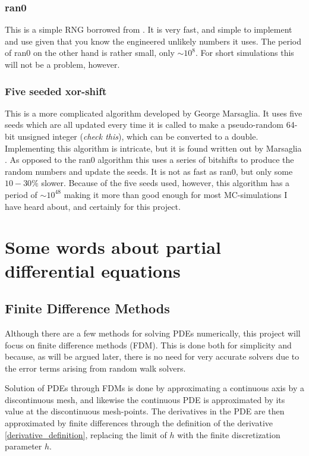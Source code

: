 \subsubsection{ran0}

This is a simple RNG borrowed from \cite{hjorth2011computational}. 
It is very fast, and simple to implement and use given that you know the engineered unlikely numbers it uses. 
The period of ran0 on the other hand is rather small, only $\sim 10^8$. For short simulations this will not be a problem, however.

\subsubsection{Five seeded xor-shift}

This is a more complicated algorithm developed by George Marsaglia. 
It uses five seeds which are all updated every time it is called to make a pseudo-random 64-bit unsigned integer (\emph{check this}), which can be converted to a double. 
Implementing this algorithm is intricate, but it is found written out by Marsaglia \cite{marsaglia2003xorshift}. 
As opposed to the ran0 algorithm this uses a series of bitshifts to produce the random numbers and update the seeds. 
It is not as fast as ran0, but only some $10-30\%$ slower. 
Because of the five seeds used, however, this algorithm has a period of $\sim10^{48}$ \cite{marsaglia2003xorshift} making it more than good enough for most MC-simulations I have heard about, and certainly for this project.

\section{Some words about partial differential equations}\label{some_words_on_PDEs}

\subsection{Finite Difference Methods}\label{finite_difference_methods}

Although there are a few methods for solving PDEs numerically, this project will focus on finite difference methods (FDM). 
This is done both for simplicity and because, as will be argued later, there is no need for very accurate solvers due to the error terms arising from random walk solvers. 

Solution of PDEs through FDMs is done by approximating a continuous axis by a discontinuous mesh, and likewise the continuous PDE is approximated by its value at the discontinuous mesh-points. 
The derivatives in the PDE are then approximated by finite differences through the definition of the derivative \eqref{derivative_definition}, replacing the limit of $h$ with the  finite discretization parameter $h$.

